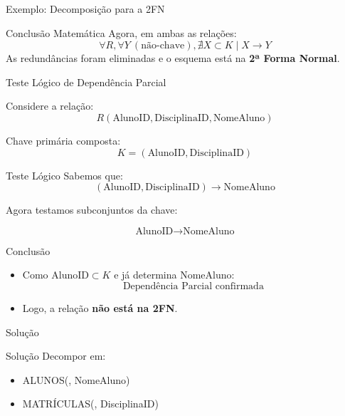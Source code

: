 \documentclass[9pt]{beamer}
\begin{document}
\begin{frame}{Exemplo: Decomposição para a 2FN}
\vspace{0.4cm}

\begin{block}{Conclusão Matemática}
Agora, em ambas as relações:
\[
\forall R, \forall Y \ (\text{não-chave}), \nexists X \subset K \mid X \rightarrow Y
\]
As redundâncias foram eliminadas e o esquema está na \textbf{2ª Forma Normal}.
\end{block}

\end{frame}


\begin{frame}{Teste Lógico de Dependência Parcial}
\small

Considere a relação:
\[
R(\text{AlunoID}, \text{DisciplinaID}, \text{NomeAluno})
\]

Chave primária composta:
\[
K = (\text{AlunoID}, \text{DisciplinaID})
\]

\vspace{0.4cm}

\begin{block}{Teste Lógico}
Sabemos que:
\[
(\text{AlunoID}, \text{DisciplinaID}) \rightarrow \text{NomeAluno}
\]

Agora testamos subconjuntos da chave:

\[
\text{AlunoID} \rightarrow \text{NomeAluno}
\]

\end{block}

\vspace{0.3cm}

\begin{alertblock}{Conclusão}
\begin{itemize}
    \item Como $\text{AlunoID} \subset K$ e já determina $\text{NomeAluno}$:
    \[
    \text{Dependência Parcial confirmada}
    \]
    \item Logo, a relação \textbf{não está na 2FN}.
\end{itemize}
\end{alertblock}

\vspace{0.3cm}


\end{frame}
\begin{frame}{Solução}

\begin{block}{Solução}
Decompor em:
\begin{itemize}
    \item ALUNOS(, NomeAluno)
    \item MATRÍCULAS(, DisciplinaID)
\end{itemize}
\end{block}
\end{frame}
\end{document}
